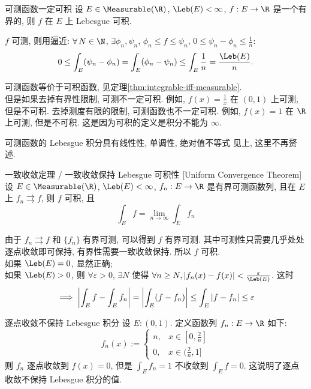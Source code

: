 \begin{thm}
    {可测函数一定可积}
    设 $E\in\Measurable(\R)$, \(\Leb(E)<\infty\), \(f:E\to\R\) 是一个有界的\MeasurableFunc{}, 则 \(f\) 在 \(E\) 上 Lebesgue 可积.
\end{thm}
\begin{prf}
    \(f\) 可测, 则用\SimpleFunc{}逼近: \(\forall\,N\in\N\), \(\exists\phi_n,\psi_n\), \(\phi_n\leq f\leq \psi_n\), \(0\leq\psi_n-\phi_n\leq\frac{1}{n}\):
    \[0\leq\int_E(\psi_n-\phi_n)=\int_E(\phi_n-\psi_n)\leq\int_E\frac{1}{n}= \frac{\Leb(E)}{n}.\]
\end{prf}
\begin{rmk}
    可测函数等价于可积函数, 见定理\ref{thm:integrable-iff-measurable}. \\
    但是如果去掉有界性限制, 可测不一定可积. 例如, \(f(x)=\frac{1}{x}\) 在 \((0,1)\) 上可测, 但是不可积. 
    去掉测度有限的限制, 可测函数也不一定可积. 例如, \(f(x)=1\) 在 \(\R\) 上可测, 但是不可积. 这是因为可积的定义是积分不能为 \(\infty\).
\end{rmk}
\begin{ppt}
    {可测函数的 Lebesgue 积分具有线性性, 单调性, 绝对值不等式}
    见上, 这里不再赘述.
\end{ppt}
\begin{thm}
    {一致收敛定理 / 一致收敛保持 Lebesgue 可积性}
    [Uniform Convergence Theorem]
    设 $E\in\Measurable(\R)$, \(\Leb(E)<\infty\), \(f_n:E\to\R\) 是有界可测函数列, 且在 \(E\) 上 \(f_n\rightrightarrows f\), 则 \(f\) 可积, 且 
    \[\int_E f = \lim_{n\to\infty} \int_E f_n\]
\end{thm}
\begin{prf}
    由于 \(f_n\rightrightarrows f\) 和 \(\{f_n\}\) 有界可测, 可以得到 \(f\) 有界可测. 其中可测性只需要几乎处处逐点收敛即可保持, 有界性需要一致收敛保持. 所以 \(f\) 可积.\\
    如果 \(\Leb(E)=0\), 显然正确;\\
    如果 \(\Leb(E)>0\), 则 \(\forall\varepsilon>0\), \(\exists N\) 使得 \(\forall n\geq N, |f_n(x)-f(x)|<\frac{\varepsilon}{\Leb(E)}\). 这时
    \[\implies\vqty{\int_E f-\int_Ef_n}=\vqty{\int_E(f-f_n)}\leq\int_E|f-f_n|\leq\varepsilon\]
\end{prf}
\begin{cxmp}
    {逐点收敛不保持 Lebesgue 积分}
    设 $E:(0,1)$. 定义函数列 \(f_n:E\to\R\) 如下:
    \[f_n(x):=\begin{cases}
        n, & x\in[0,\frac{2}{n}]\\
        0, & x\in(\frac{2}{n},1]
    \end{cases}\]
    则 \(f_n\) 逐点收敛到 \(f(x)=0\), 但是 \(\int_E f_n = 1\) 不收敛到 \(\int_E f=0\). 这说明了逐点收敛不保持 Lebesgue 积分的值.
\end{cxmp}
